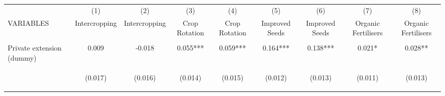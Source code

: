 \begin{center}
\begin{tabular}{lcccccccc} \hline
 & (1) & (2) & (3) & (4) & (5) & (6) & (7) & (8) \\
VARIABLES & Intercropping & Intercropping & Crop Rotation & Crop Rotation & Improved Seeds & Improved Seeds & Organic Fertilisers & Organic Fertilisers \\ \hline
\vspace{4pt} & \begin{footnotesize}\end{footnotesize} & \begin{footnotesize}\end{footnotesize} & \begin{footnotesize}\end{footnotesize} & \begin{footnotesize}\end{footnotesize} & \begin{footnotesize}\end{footnotesize} & \begin{footnotesize}\end{footnotesize} & \begin{footnotesize}\end{footnotesize} & \begin{footnotesize}\end{footnotesize} \\
Private extension (dummy) & 0.009 & -0.018 & 0.055*** & 0.059*** & 0.164*** & 0.138*** & 0.021* & 0.028** \\
\vspace{4pt} & \begin{footnotesize}(0.017)\end{footnotesize} & \begin{footnotesize}(0.016)\end{footnotesize} & \begin{footnotesize}(0.014)\end{footnotesize} & \begin{footnotesize}(0.015)\end{footnotesize} & \begin{footnotesize}(0.012)\end{footnotesize} & \begin{footnotesize}(0.013)\end{footnotesize} & \begin{footnotesize}(0.011)\end{footnotesize} & \begin{footnotesize}(0.013)\end{footnotesize} \\

\end{tabular}
\end{center}
